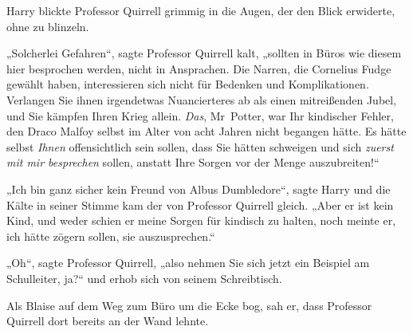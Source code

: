 Harry blickte Professor Quirrell grimmig in die Augen, der den Blick erwiderte, ohne zu blinzeln.

„Solcherlei Gefahren“, sagte Professor Quirrell kalt, „sollten in Büros wie diesem hier besprochen werden, nicht in Ansprachen. Die Narren, die Cornelius Fudge gewählt haben, interessieren sich nicht für Bedenken und Komplikationen. Verlangen Sie ihnen irgendetwas Nuancierteres ab als einen mitreißenden Jubel, und Sie kämpfen Ihren Krieg allein. \emph{Das}, Mr~Potter, war Ihr kindischer Fehler, den Draco Malfoy selbst im Alter von acht Jahren nicht begangen hätte. Es hätte selbst \emph{Ihnen} offensichtlich sein sollen, dass Sie hätten schweigen und sich \emph{zuerst mit mir besprechen} sollen, anstatt Ihre Sorgen vor der Menge auszubreiten!“

„Ich bin ganz sicher kein Freund von Albus Dumbledore“, sagte Harry und die Kälte in seiner Stimme kam der von Professor Quirrell gleich.
„Aber er ist kein Kind, und weder schien er meine Sorgen für kindisch zu halten, noch meinte er, ich hätte zögern sollen, sie auszusprechen.“

„Oh“, sagte Professor Quirrell, „also nehmen Sie sich jetzt ein Beispiel am Schulleiter, ja?“ und erhob sich von seinem Schreibtisch.

\later

Als Blaise auf dem Weg zum Büro um die Ecke bog, sah er, dass Professor Quirrell dort bereits an der Wand lehnte.


